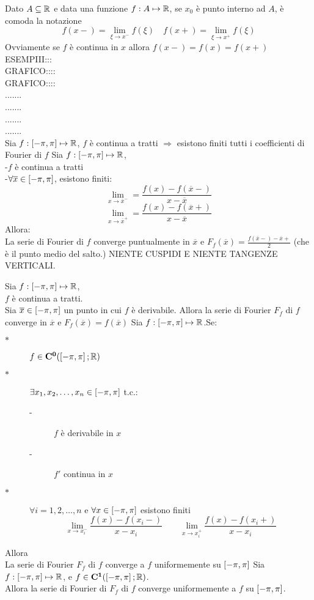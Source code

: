 \observation
Dato $A\subseteq \mathbb{R}$ e data una funzione $f:A \mapsto \mathbb{R}$, se $x_0$ è punto interno ad $A$, è comoda la notazione
\[f(x-)=\lim\limits_{\xi\to x^{-}}f(\xi)\quad f(x+)=\lim\limits_{\xi\to x^{+}}f(\xi)\]
Ovviamente se $f$ è continua in $x$ allora $f(x-)=f(x)=f(x+)$
ESEMPIII:::\\
GRAFICO::::\\
GRAFICO::::\\
.......\\
.......\\
.......\\
.......\\
\proposition
Sia $f: \left[-\pi,\pi\right] \mapsto \mathbb{R}$, $f$ è continua a tratti $\Rightarrow$ esistono finiti tutti i coefficienti di Fourier di $f$
\proposition
Sia $f: \left[-\pi,\pi\right] \mapsto \mathbb{R}$,\\
-$f$ è continua a tratti\\
-$\forall \overline{x} \in\left[-\pi,\pi\right]$, esistono finiti:\\
\[ \lim\limits_{x\to\overline{x}^{-}}=\frac{f(x)-f(\overline{x}-)}{x-\overline{x}} \]
\[ \lim\limits_{x\to\overline{x}^{+}}=\frac{f(x)-f(\overline{x}+)}{x-\overline{x}} \]
Allora:\\
La serie di Fourier di $f$ converge puntualmente in $\overline{x}$ e $F_f(\overline{x})=\frac{f(\overline{x}-)-\overline{x}+}{2}$ (che è il punto medio del salto.)
\observation NIENTE CUSPIDI E NIENTE TANGENZE VERTICALI.

\corollary
Sia $f: \left[-\pi,\pi\right] \mapsto \mathbb{R}$,\\
$f$ è continua a tratti.\\
Sia $\overline{x}\in\left[-\pi,\pi\right]$ un punto in cui $f$ è derivabile. Allora la serie di Fourier $F_f$ di $f$ converge in $\overline{x}$ e $F_f(\overline{x})=f(\overline{x})$
\proposition
Sia $f: \left[-\pi,\pi\right] \mapsto \mathbb{R}$.Se:\\
\begin{description}
	\item[$\ast$] $f\in \mathbf{C^{0}}(\left[-\pi,\pi\right]; \mathbb{R})$
	\item[$\ast$] $\exists x_1,x_2,\dotsc,x_n\in\left[-\pi,\pi\right]$ t.c.:
	\begin{description}
		\item[-] $f$ è derivabile in $x$
		\item[-] $f'$ continua in $x$
	\end{description}
	\item[$\ast$] $\forall i=1,2,\dotsc,n$ e $\forall x\in\left[-\pi,\pi\right]$ esistono finiti
	\[\lim\limits_{x\to x_i^{-}}\frac{f(x)-f(x_i-)}{x-x_i}\qquad \lim\limits_{x\to x_i^{+}}\frac{f(x)-f(x_i+)}{x-x_i}\]

\end{description}
Allora\\
La serie di Fourier $F_f$ di $f$ converge a $f$ uniformemente su $\left[-\pi,\pi\right]$
\corollary
Sia $f: \left[-\pi,\pi\right] \mapsto \mathbb{R}$, e $f\in \mathbf{C^{1}}(\left[-\pi,\pi\right]; \mathbb{R})$.\\
Allora la serie di Fourier di $F_f$ di $f$ converge uniformemente a $f$ su $\left[-\pi,\pi\right]$.